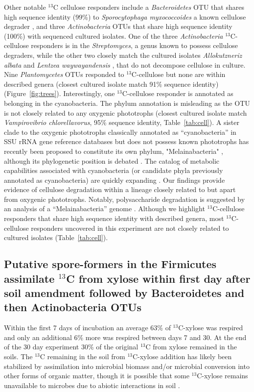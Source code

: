 Other notable $^{13}$C cellulose responders include a \textit{Bacteroidetes}
OTU that shares high sequence identity (99\%) to \textit{Sporocytophaga
myxococcoides} a known cellulose degrader \citep{Vance_1980}, and three
\textit{Actinobacteria} OTUs that share high sequence identity (100\%) with
sequenced cultured isolates. One of the three \textit{Actinobacteria}
$^{13}$C-cellulose responders is in the \textit{Streptomyces}, a genus known to
possess cellulose degraders, while the other two closely match the cultured isolates
\textit{Allokutzneriz albata} \citep{Labeda_2008, Tomita_1993} and
\textit{Lentzea waywayandensis} \citep{LABEDA_1989, Labeda_2001}, that do not
decompose cellulose in culture. Nine \textit{Plantomycetes} OTUs responded to
$^{13}$C-cellulose but none are within described genera (closest cultured isolate
match 91\% sequence identity) (Figure~\ref{fig:trees}). Interestingly, one
$^{13}$C-cellulose responder is annotated as belonging in the
cyanobacteria. The phylum annotation is misleading as the OTU is not
closely related to any oxygenic phototrophs (closest cultured isolate match
\textit{Vampirovibrio chlorellavorus}, 95\% sequence identity, Table~\ref{tab:cell}). A sister clade
to the oxygenic phototrophs classically annotated as ``cyanobacteria'' in
SSU rRNA gene reference databases but does not possess known phototrophs has
recently been proposed to constitute its own phylum, "Melainabacteria"
\citet{Di_Rienzi_2013}, although its phylogenetic position is debated
\citep{Soo_2014}. The catalog of metabolic capabilities associated with
cyanobacteria (or candidate phyla previously annotated as
cyanobacteria) are quickly expanding \citep{Di_Rienzi_2013, Soo_2014}.
Our findings provide evidence of cellulose degradation within a lineage closely
related to but apart from oxygenic phototrophs. Notably, polysaccharide
degradation is suggested by an analysis of a ``Melainabacteria'' genome
\citep{Di_Rienzi_2013}. Although we highlight $^{13}$C-cellulose responders
that share high sequence identity with described genera, most
$^{13}$C-cellulose responders uncovered in this experiment are not closely
related to cultured isolates (Table~\ref{tab:cell}).

\subsection{Putative spore-formers in the Firmicutes assimilate $^{13}$C from
xylose within first day after soil amendment followed by Bacteroidetes and then
Actinobacteria OTUs} 
Within the first 7 days of incubation an average 63\% of $^{13}$C-xylose was
respired and only an additional 6\% more was respired between days 7 and 30. At
the end of the 30 day experiment 30\% of the original $^{13}$C from xylose
remained in the soils. The $^{13}$C remaining in the soil from $^{13}$C-xylose
addition has likely been stabilized by assimilation into microbial biomass
and/or microbial conversion into other forms of organic matter, though it is
possible that some $^{13}$C-xylose remains unavailable to microbes due to
abiotic interactions in soil \citep{Kalbitz_2000}. 

